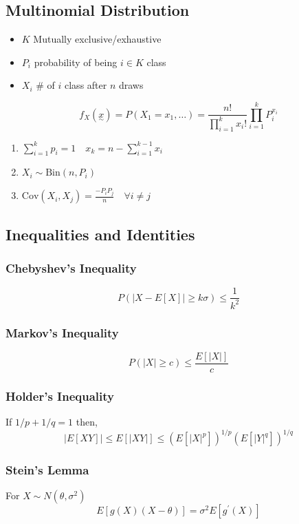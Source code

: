 	\subsection{Multinomial Distribution}
		\begin{itemize}
			\item \(K\) Mutually exclusive/exhaustive
			\item \(P_i\) probability of being \(i\in K\) class
			\item \(X_i\) \# of \(i\) class after \(n\) draws
		\end{itemize}
		\[ f_X(\underset{\sim}{x}) = P(X_1=x_1,\ldots) = \frac{n!}{\prod_{i=1}^{k}x_i!} \prod_{i=1}^{k}P^{x_i}_i \]
		\begin{enumerate}
			\item \(\sum_{i=1}^{k}p_i=1 \quad x_k=n-\sum_{i=1}^{k-1}x_i \)
			\item \(X_i\sim \text{Bin}(n,P_i)\)
			\item \(\text{Cov}(X_i,X_j) = \frac{-P_iP_j}{n} \quad \forall i\neq j\)
		\end{enumerate}
	
	
	\subsection*{Inequalities and Identities}
		\subsubsection*{Chebyshev's Inequality}
			\[P(|X-E[X]|\geq k\sigma) \leq \frac{1}{k^2}\]
		\subsubsection*{Markov's Inequality}
			\[P(|X|\geq c)\leq \frac{E[|X|]}{c}\]
		\subsubsection*{Holder's Inequality}
			If \(1/p+1/q=1\) then,
			\[ |E[XY]| \leq E[|XY|]\leq (E[|X|^p])^{1/p}(E[|Y|^q])^{1/q} \]
		\subsubsection*{Stein's Lemma}
			For \(X\sim N(\theta,\sigma^2)\)
			\[ E[g(X)(X-\theta)] = \sigma^2 E[g^\prime(X)] \]
		
		
		
		

		
	